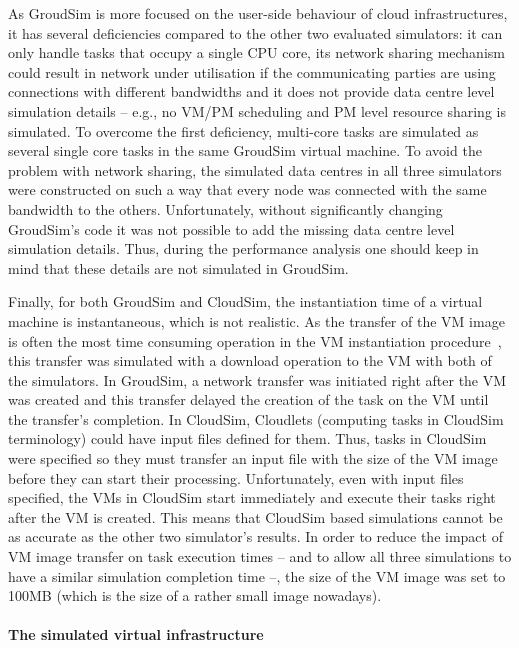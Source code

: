 \documentclass[sort, compress, 5p]{elsarticle}
\begin{document}
As GroudSim is more focused on the user-side behaviour of cloud infrastructures, it has several deficiencies compared to the other two evaluated simulators:  it can only handle tasks that occupy a single CPU core,  its network sharing mechanism could result in network under utilisation if the communicating parties are using connections with different bandwidths and   it does not provide data centre level simulation details -- e.g., no VM/PM scheduling and PM level resource sharing is simulated. To overcome the first deficiency, multi-core tasks are simulated as several single core tasks in the same GroudSim virtual machine. To avoid the problem with network sharing, the simulated data centres in all three simulators were constructed on such a way that every node was connected with the same bandwidth to the others. Unfortunately, without significantly changing GroudSim's code it was not possible to add the missing data centre level simulation details. Thus, during the performance analysis one should keep in mind that these details are not simulated in GroudSim.

Finally, for both GroudSim and CloudSim, the instantiation time of a virtual machine is instantaneous, which is not realistic. As the transfer of the VM image is often the most time consuming operation in the VM instantiation procedure~\cite{DISS}, this transfer was simulated with a download operation to the VM with both of the simulators. In GroudSim, a network transfer was initiated right after the VM was created and this transfer delayed the creation of the task on the VM until the transfer's  completion. In CloudSim, Cloudlets (computing tasks in CloudSim terminology) could have input files defined for them. Thus, tasks in CloudSim were specified so they must transfer an input file with the size of the VM image before they can start their processing. Unfortunately, even with input files specified, the VMs in CloudSim start immediately and execute their tasks right after the VM is created. This means that CloudSim based simulations cannot be as accurate as the other two simulator's results. In order to reduce the impact of VM image transfer on task execution times -- and to allow all three simulations to have a similar simulation completion time --, the size of the VM image was set to 100MB (which is the size of a rather small image nowadays).

\paragraph{The simulated virtual infrastructure}
\end{document}
